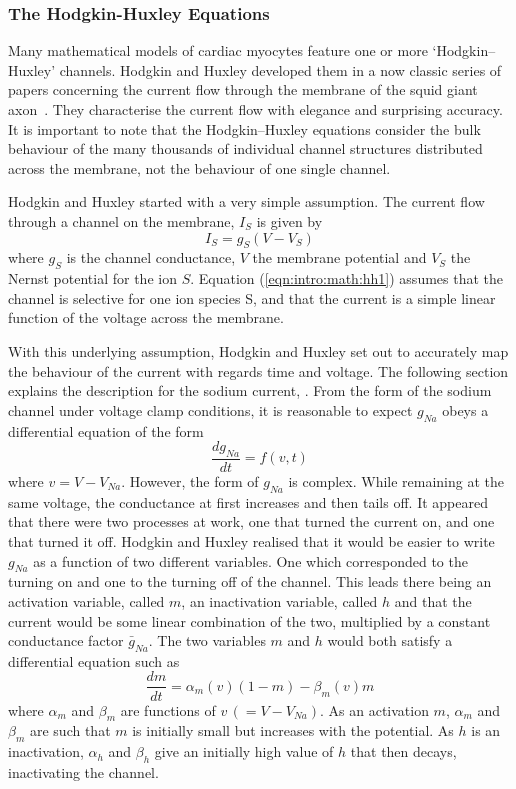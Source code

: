 \subsubsection{The Hodgkin-Huxley Equations}

Many mathematical models of cardiac myocytes feature one or more
`Hodgkin--Huxley' channels.
Hodgkin and Huxley developed them in a now classic series of papers concerning
the current flow through the membrane of the squid giant
axon~\cite{Hodgkin1952,Keener1998}.
They characterise the current flow with elegance and surprising accuracy.
It is important to note that the Hodgkin--Huxley equations consider the bulk
behaviour of the many thousands of individual channel structures distributed
across the membrane, not the behaviour of one single channel.

Hodgkin and Huxley started with a very simple assumption.
The current flow through a channel on the membrane, $I_{S}$ is given by
\begin{equation}
I_{S} = g_{S}\left(V-V_{S}\right)
\label{eqn:intro:math:hh1}
\end{equation}
where $g_{S}$ is the channel conductance, $V$ the membrane potential and $V_{S}$
the Nernst potential for the ion $S$.
Equation (\ref{eqn:intro:math:hh1}) assumes that the channel is selective for
one ion species S, and that the current is a simple linear function of the
voltage across the membrane.

With this underlying assumption, Hodgkin and Huxley set out to accurately map
the behaviour of the current with regards time and voltage.
The following section explains the description for the sodium current, .
From the form of the sodium channel under voltage clamp conditions, it is
reasonable to expect $g_{Na}$ obeys a differential equation of the form
\begin{equation}
\frac{dg_{Na}}{dt} = f\left(v,t\right)
\label{eqn:intro:math:hh2}
\end{equation}
where $v=V-V_{Na}$.
However, the form of $g_{Na}$ is complex.
While remaining at the same voltage, the conductance at first increases and then
tails off.
It appeared that there were two processes at work, one that turned the current
on, and one that turned it off.
Hodgkin and Huxley realised that it would be easier to write $g_{Na}$ as a
function of two different variables.
One which corresponded to the turning on and one to the turning off of the
channel.
This leads there being an activation variable, called $m$, an inactivation
variable, called $h$ and that the current would be some linear combination of the
two, multiplied by a constant conductance factor $\bar{g}_{Na}$.
The two variables $m$ and $h$ would both satisfy a differential equation such as
\begin{equation}
\frac{dm}{dt}=\alpha_{m}\left(v\right)\left(1-m\right) -
\beta_{m}\left(v\right)m
\label{eqn:intro:math:dmdt}
\end{equation}
where $\alpha_{m}$ and $\beta_{m}$ are functions of $v\,\left(=V-V_{Na}\right)$.
As an activation $m$, $\alpha_{m}$ and $\beta_{m}$ are such that $m$ is
initially small but increases with the potential.
As $h$ is an inactivation, $\alpha_{h}$ and $\beta_{h}$ give an initially high
value of $h$ that then decays, inactivating the channel.

